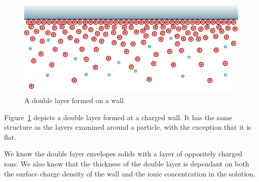     \begin{figure}
        \centering
        \includegraphics{content/pt1/01-PowerHarvesting/graphics/doubleLayerOnWall}
        \caption{\label{fig:doubleLayerOnWall}A double layer formed on a wall}
    \end{figure}

    Figure~\ref{fig:doubleLayerOnWall} depicts a double layer formed at a charged wall.
    It has the same structure as the layers examined around a particle, with the exception that it is flat.

    We know the double layer envelopes solids with a layer of oppositely charged ions.
    We also know that the thickness of the double layer is dependant on both the surface charge density of the wall and the ionic concentration in the solution.



